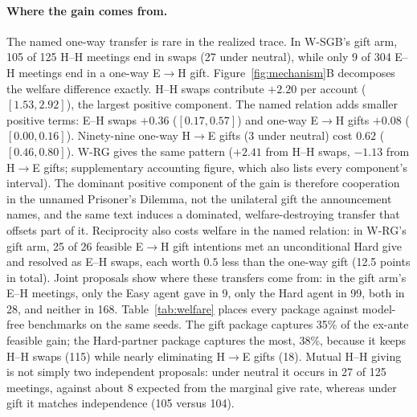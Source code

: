 \documentclass[sigconf,anonymous]{aamas}
\begin{document}
\paragraph{Where the gain comes from.}  The named one-way transfer is rare in
the realized trace.  In W-SGB's gift arm, 105 of 125 H--H meetings end in swaps
(27 under neutral), while only 9 of 304 E--H meetings end in a one-way
E$\rightarrow$H gift.  Figure~\ref{fig:mechanism}B decomposes the welfare
difference exactly.  H--H swaps contribute $+2.20$ per account
($[1.53,2.92]$), the largest positive component.  The named relation adds
smaller positive terms: E--H swaps $+0.36$ ($[0.17,0.57]$) and one-way
E$\rightarrow$H gifts $+0.08$ ($[0.00,0.16]$).  Ninety-nine one-way
H$\rightarrow$E gifts (3 under neutral) cost $0.62$ ($[0.46,0.80]$).  W-RG gives
the same pattern ($+2.41$ from H--H swaps, $-1.13$ from H$\rightarrow$E gifts;
supplementary accounting figure, which also lists every component's interval).
The dominant positive component of the gain is therefore cooperation in the
unnamed Prisoner's Dilemma, not the unilateral gift the announcement names, and
the same text induces a dominated, welfare-destroying transfer that offsets part
of it.  Reciprocity also
costs welfare in the named relation: in W-RG's gift arm, 25 of 26 feasible
E$\rightarrow$H gift intentions met an unconditional Hard give and resolved as
E--H swaps, each worth $0.5$ less than the one-way gift (12.5 points in total).
Joint proposals show where these transfers come from: in the gift arm's E--H
meetings, only the Easy agent gave in 9, only the Hard agent in 99, both in 28,
and neither in 168.  Table~\ref{tab:welfare} places every package against
model-free benchmarks on the same seeds.  The gift package captures 35\% of the
ex-ante feasible gain; the Hard-partner package captures the most, 38\%, because
it keeps H--H swaps (115) while nearly eliminating H$\rightarrow$E gifts (18).
Mutual H--H giving is not simply two independent proposals: under neutral it
occurs in 27 of 125 meetings, against about 8 expected from the marginal give
rate, whereas under gift it matches independence (105 versus 104).
\end{document}
